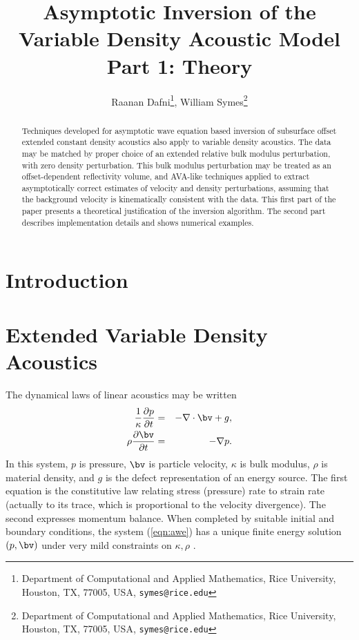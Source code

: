 \title{Asymptotic Inversion of the Variable Density Acoustic
  Model\\Part 1: Theory}

\author{
Raanan Dafni\thanks{Department of Computational and Applied Mathematics, Rice University, 
Houston, TX, 77005, USA, 
{\tt symes@rice.edu}},
William Symes\thanks{Department of Computational and Applied Mathematics, Rice University, 
Houston, TX, 77005, USA, 
{\tt symes@rice.edu}}
}



\maketitle
\parskip 12pt

\begin{abstract}
Techniques developed for asymptotic wave equation based inversion of
subsurface offset extended constant density acoustics also apply to variable density
acoustics. The data may be matched by proper choice of an extended
relative bulk modulus perturbation, with zero density
perturbation. This bulk modulus perturbation may be treated as an
offset-dependent reflectivity volume, and AVA-like techniques applied
to extract asymptotically correct estimates of velocity and density
perturbations, assuming that the background velocity is kinematically
consistent with the data. This first part of the paper presents a 
theoretical justification of the inversion algorithm. The second part
describes implementation details and shows numerical examples.
\end{abstract}
\setlength{\parindent}{0cm}
\section{Introduction}

\section{Extended Variable Density Acoustics}
The dynamical laws of linear acoustics may be written
\begin{eqnarray}
\label{eqn:awe}
\frac{1}{\kappa}\frac{\partial p}{\partial t}& =& -\nabla \cdot \bv +
g,\nonumber \\
\rho \frac{\partial \bv}{\partial t} & = & -\nabla p.
\end{eqnarray}
In this system, $p$ is pressure, $\bv$ is particle velocity, $\kappa$
is bulk modulus, $\rho$ is material density, and $g$ is the defect
representation of an energy source. The first equation is the
constitutive law relating stress (pressure) rate to strain rate (actually to its
trace, which is proportional to the velocity divergence). The second
expresses momentum balance. When completed by suitable initial and
boundary conditions, the system (\ref{eqn:awe}) has a unique finite
energy solution $(p,\bv)$ under very mild constraints on $\kappa,
\rho$ \cite[]{BlazekStolkSymes:13}.


